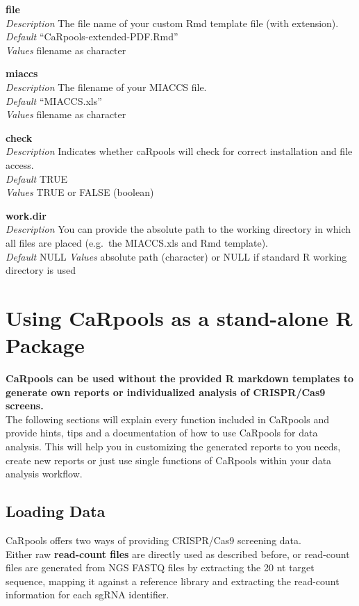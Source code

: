 \documentclass[]{article}
\begin{document}
\textbf{file}\\
\emph{Description} The file name of your custom Rmd template file (with
extension).\\
\emph{Default} ``CaRpools-extended-PDF.Rmd''\\
\emph{Values} filename as character

\textbf{miaccs}\\
\emph{Description} The filename of your MIACCS file.\\
\emph{Default} ``MIACCS.xls''\\
\emph{Values} filename as character

\textbf{check}\\
\emph{Description} Indicates whether caRpools will check for correct
installation and file access.\\
\emph{Default} TRUE\\
\emph{Values} TRUE or FALSE (boolean)

\textbf{work.dir}\\
\emph{Description} You can provide the absolute path to the working
directory in which all files are placed (e.g.~the MIACCS.xls and Rmd
template).\\
\emph{Default} NULL \emph{Values} absolute path (character) or NULL if
standard R working directory is used

\newpage

\section{Using CaRpools as a stand-alone R
Package}\label{using-carpools-as-a-stand-alone-r-package}

\textbf{CaRpools can be used without the provided R markdown templates
to generate own reports or individualized analysis of CRISPR/Cas9
screens.}\\
The following sections will explain every function included in CaRpools
and provide hints, tips and a documentation of how to use CaRpools for
data analysis. This will help you in customizing the generated reports
to you needs, create new reports or just use single functions of
CaRpools within your data analysis workflow.

\subsection{Loading Data}\label{loading-data}

CaRpools offers two ways of providing CRISPR/Cas9 screening data.\\
Either raw \textbf{read-count files} are directly used as described
before, or read-count files are generated from NGS FASTQ files by
extracting the 20 nt target sequence, mapping it against a reference
library and extracting the read-count information for each sgRNA
identifier.
\end{document}
